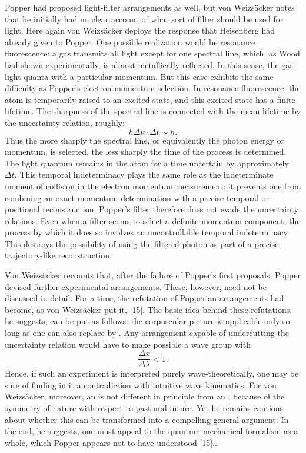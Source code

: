 \documentclass[final,12pt]{article}
\newcommand{\vW}{von Weizsäcker\xspace}
\newcommand{\VW}{Von Weizsäcker\xspace}
\newcommand{\pos}{\ensuremath{x}\xspace}
\begin{document}
Popper had proposed light-filter arrangements as well, but \vW notes that he initially had no clear account of what sort of filter should be used for light. Here again \vW deploys the response that Heisenberg had already given to Popper. One possible realization would be resonance fluorescence: a gas transmits all light except for one spectral line, which, as Wood had shown experimentally, is almost metallically reflected. In this sense, the gas  light quanta with a particular momentum. But this case exhibits the same difficulty as Popper's electron momentum selection. In resonance fluorescence, the atom is temporarily raised to an excited state, and this excited state has a finite lifetime. The sharpness of the spectral line is connected with the mean lifetime by the uncertainty relation, roughly:
\begin{equation*}
h \Delta \nu \cdot \Delta t \sim h.
\end{equation*}
%
Thus the more sharply the spectral line, or equivalently the photon energy or momentum, is selected, the less sharply the time of the process is determined. The light quantum remains in the atom for a time uncertain by approximately $\Delta t$. This temporal indeterminacy plays the same role as the indeterminate moment of collision in the electron momentum measurement: it prevents one from combining an exact momentum determination with a precise temporal or positional reconstruction. Popper's filter therefore does not evade the uncertainty relations. Even when a filter seems to select a definite momentum component, the process by which it does so involves an uncontrollable temporal indeterminacy. This destroys the possibility of using the filtered photon as part of a precise trajectory-like reconstruction.

\VW recounts that, after the failure of Popper's first proposals, Popper devised further experimental arrangements. These, however, need not be discussed in detail. For a time, the refutation of Popperian arrangements had become, as \vW put it,  [15]. The basic idea behind these refutations, he suggests, can be put as follows: the corpuscular picture is applicable only so long as one can also replace  by . Any arrangement capable of undercutting the uncertainty relation would have to make possible a wave group with
\begin{equation*}
\frac{\Delta \pos}{\Delta \lambda}<1.
\end{equation*}
Hence, if such an experiment is interpreted purely wave-theoretically, one may be sure of finding in it a contradiction with intuitive wave kinematics. For \vW, moreover, an  is not different in principle from an , because of the symmetry of nature with respect to past and future. Yet he remains cautious about whether this  can be transformed into a compelling general argument. In the end, he suggests, one must appeal to the quantum-mechanical formalism as a whole, which Popper appears not to have understood [15]..
\end{document}
